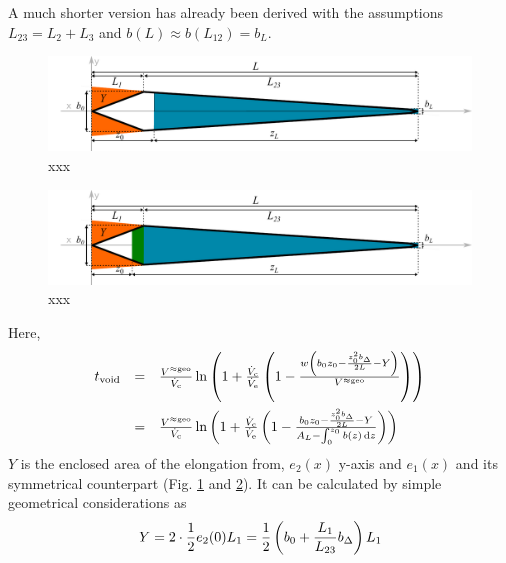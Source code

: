 A much shorter version has already been derived  with the assumptions $L_{23} = L_2 
+ L_3$ and $b(L) \approx b(L_{12}) = b_L$.
\begin{figure}[h]
  \begin{center}
    \includegraphics[width=\linewidth]{./images/fffApprox1.pdf}
    \vspace*{-3ex}    
  \end{center}
  \caption[Passed area section - distal focussing, simplified approximation]{xxx}
  \label{fig:fffApprox1} 
\end{figure}
\begin{figure}[h]
  \begin{center}
    \includegraphics[width=\linewidth]{./images/fffApprox2.pdf}
    \vspace*{-3ex}    
  \end{center}
  \caption[Passed area section - distal focussing, simplified approximation]{xxx}
  \label{fig:fffApprox2} 
\end{figure}

Here, 
\begin{equation}
\begin{array}{lll}
\tvoid &= & \frac{\Vappgeo}{\Vc} \ln{
  \left(
  1 + \frac{\Vc}{\Ve}
  \left(
  1 - \frac{
    w 
    \left(
    b_0 z_0 
    - \frac{
      z_0^2 \bDelta
    }{
      2L} 
    - Y
    \right)
  }{\Vappgeo}
  \right)
  \right)}
\\\addlinespace
&= &\frac{\Vappgeo}{\Vc} \ln{
  \left(
  1 + \frac{\Vc}{\Ve}
  \left(
  1 - \frac{
    b_0 z_0 
    - \frac{
      z_0^2 \bDelta
    }{
      2L
    } 
    -  Y
  }{
  A_L -  \int_{0}^{z_0} b(z) \diff z
}
  \right)
  \right)}
\end{array}
\end{equation}
$Y$ is the enclosed area of the elongation from,
$e_2(x)$ y-axis and $e_1(x)$ and its symmetrical counterpart 
(Fig. \ref{fig:fffApprox1} and \ref{fig:fffApprox2}). 
It can be calculated by simple geometrical considerations as 
\begin{equation}
Y = 2 \cdot \frac{1}{2} e_2(0) L_1 = \frac{1}{2}\left( b_0 + \frac{L_1}{L_{23}} b_\Delta \right) L_1
\end{equation}

